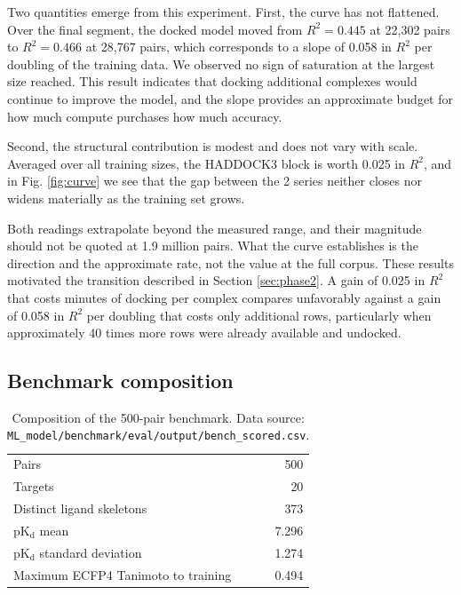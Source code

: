 \documentclass[11pt]{article}
\newcommand{\pkd}{\ensuremath{\mathrm{pK_d}}}
\begin{document}
Two quantities emerge from this experiment. First, the curve has not flattened.
Over the final segment, the docked model moved from $R^2 = 0.445$ at 22,302
pairs to $R^2 = 0.466$ at 28,767 pairs, which corresponds to a slope of 0.058
in $R^2$ per doubling of the training data. We observed no sign of saturation
at the largest size reached. This result indicates that docking additional
complexes would continue to improve the model, and the slope provides an
approximate budget for how much compute purchases how much accuracy.

Second, the structural contribution is modest and does not vary with scale.
Averaged over all training sizes, the HADDOCK3 block is worth 0.025 in $R^2$,
and in Fig. \ref{fig:curve} we see that the gap between the 2 series neither
closes nor widens materially as the training set grows.

Both readings extrapolate beyond the measured range, and their magnitude should
not be quoted at 1.9 million pairs. What the curve establishes is the direction
and the approximate rate, not the value at the full corpus. These results
motivated the transition described in Section \ref{sec:phase2}. A gain of 0.025
in $R^2$ that costs minutes of docking per complex compares unfavorably against
a gain of 0.058 in $R^2$ per doubling that costs only additional rows,
particularly when approximately 40 times more rows were already available and
undocked.

\subsection{Benchmark composition}

\begin{table}[H]
\centering
\caption{Composition of the 500-pair benchmark. Data source:
\texttt{ML\_model/benchmark/eval/output/bench\_scored.csv}.}
\label{tab:bench}
\begin{tabular}{lr}
\toprule
Pairs                              & 500 \\
Targets                            & 20 \\
Distinct ligand skeletons          & 373 \\
\pkd{} mean                        & 7.296 \\
\pkd{} standard deviation          & 1.274 \\
Maximum ECFP4 Tanimoto to training & 0.494 \\
\bottomrule
\end{tabular}
\end{table}
\end{document}
